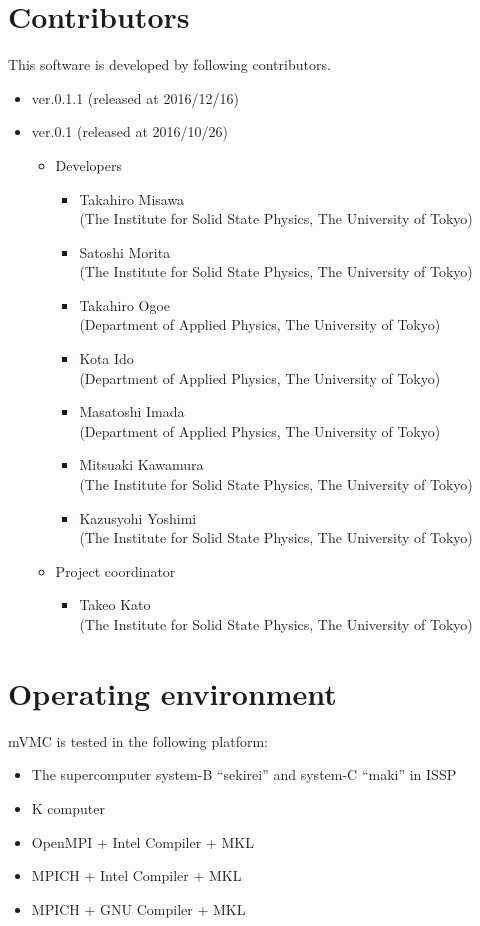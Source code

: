 \section{Contributors}
\label{subsec:developers}
This software is developed by following contributors.
\begin{itemize}
\item{ver.0.1.1 (released at 2016/12/16)}
\item{ver.0.1 (released at 2016/10/26)}
\begin{itemize}
\item{Developers}
	\begin{itemize}
	\item{Takahiro Misawa \\(The Institute for Solid State Physics, The University of Tokyo)}
	\item{Satoshi Morita \\(The Institute for Solid State Physics, The University of Tokyo)}
	\item{Takahiro Ogoe \\(Department of Applied Physics, The University of Tokyo)}
	\item{Kota Ido \\(Department of Applied Physics, The University of Tokyo)}
	\item{Masatoshi Imada \\(Department of Applied Physics, The University of Tokyo)}
	\item{Mitsuaki Kawamura \\(The Institute for Solid State Physics, The University of Tokyo)}
	\item{Kazusyohi Yoshimi \\(The Institute for Solid State Physics, The University of Tokyo)}
	\end{itemize}

\item{Project coordinator}
	\begin{itemize}
	\item{Takeo Kato \\(The Institute for Solid State Physics, The University of Tokyo)}
	\end{itemize}

\end{itemize}

\end{itemize}


\section{Operating environment}
mVMC is tested in the following platform:
\begin{itemize}
\item The supercomputer system-B ``sekirei'' and system-C ``maki'' in ISSP
\item K computer
\item OpenMPI + Intel Compiler + MKL
\item MPICH + Intel Compiler + MKL
\item MPICH + GNU Compiler + MKL
\end{itemize}
